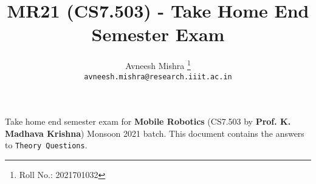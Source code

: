 

\title{MR21 (CS7.503) - Take Home End Semester Exam}
\author{
    Avneesh Mishra
    \thanks{Roll No.: 2021701032} \\
    \texttt{avneesh.mishra@research.iiit.ac.in}
}


    \maketitle

    Take home end semester exam for \textbf{Mobile Robotics} (CS7.503 by \textbf{Prof. K. Madhava Krishna})  Monsoon 2021 batch. This document contains the answers to \texttt{Theory Questions}.

    \tableofcontents
    \listoffigures

    \pagebreak

    
    \pagebreak
    
    \pagebreak
    
    \pagebreak
    
    \pagebreak


